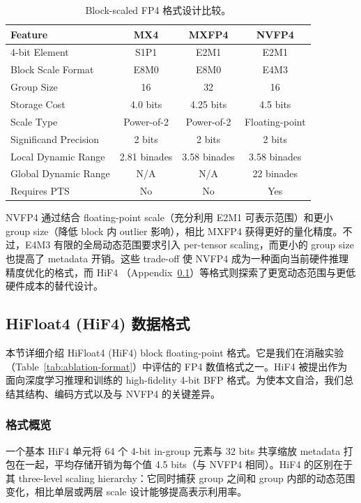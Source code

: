 \documentclass{article}
\begin{document}
\begin{table}[h]
\caption{Block-scaled FP4 格式设计比较。}
\label{tab:nvfp4-comparison}
\centering
\small
\begin{tabular}{@{}lccc@{}}
\toprule
Feature & MX4 & MXFP4 & NVFP4 \\
\midrule
4-bit Element       & S1P1       & E2M1  & E2M1 \\
Block Scale Format  & E8M0       & E8M0  & E4M3 \\
Group Size          & 16         & 32    & 16 \\
Storage Cost        & 4.0 bits   & 4.25 bits & 4.5 bits \\
Scale Type          & Power-of-2 & Power-of-2 & Floating-point \\
Significand Precision & 2 bits   & 2 bits & 2 bits \\
Local Dynamic Range & 2.81 binades & 3.58 binades & 3.58 binades \\
Global Dynamic Range & N/A       & N/A   & 22 binades \\
Requires PTS        & No         & No    & Yes \\
\bottomrule
\end{tabular}
\end{table}

NVFP4 通过结合 floating-point scale（充分利用 E2M1 可表示范围）和更小 group size（降低 block 内 outlier 影响），相比
MXFP4 获得更好的量化精度。不过，E4M3 有限的全局动态范围要求引入 per-tensor scaling，而更小的 group size
也提高了 metadata 开销。这些 trade-off 使 NVFP4 成为一种面向当前硬件推理精度优化的格式，而 HiF4
（Appendix~\ref{app:hif4}）等格式则探索了更宽动态范围与更低硬件成本的替代设计。

\subsection{HiFloat4 (HiF4) 数据格式}
\label{app:hif4}

本节详细介绍 HiFloat4 (HiF4) block floating-point 格式。它是我们在消融实验（Table~\ref{tab:ablation-format}）中评估的
FP4 数值格式之一。HiF4 被提出作为面向深度学习推理和训练的 high-fidelity 4-bit BFP 格式。为使本文自洽，我们总结其结构、编码方式以及与
NVFP4 的关键差异。

\subsubsection{格式概览}

一个基本 HiF4 单元将 64 个 4-bit in-group 元素与 32 bits 共享缩放 metadata 打包在一起，平均存储开销为每个值
4.5 bits（与 NVFP4 相同）。HiF4 的区别在于其 three-level scaling hierarchy：它同时捕获 group
之间和 group 内部的动态范围变化，相比单层或两层 scale 设计能够提高表示利用率。
\end{document}
